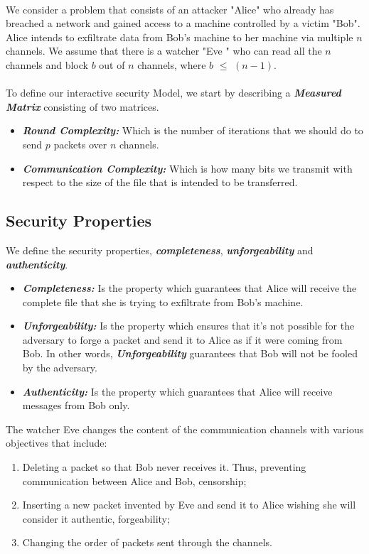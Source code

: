 \documentclass[main.tex]{subfiles}
\begin{document}
\paragraph{}
We consider a problem that consists of an attacker "Alice" who already has breached a network and gained access to a machine controlled by a victim "Bob". Alice intends to exfiltrate data from Bob's machine to her machine via multiple $n$ channels. We assume that there is a watcher "Eve " who can read all the $n$ channels and block $b$ out of $n$ channels, where $b$ $\leq$ $(n-1)$.\paragraph{} To define our interactive security Model, we start by describing a \textbf{\textit{ Measured Matrix}} consisting of two matrices. 
\begin{itemize}
  \item \textbf{\textit{ Round Complexity:}} Which is the number of iterations that we should do to send $p$ packets over $n$ channels.  \item \textbf{\textit {Communication Complexity:}} Which is how many bits we transmit with respect to the size of the file that is intended to be transferred. 
\end{itemize}
\subsection{Security Properties}
We define the security properties, \textbf{\textit{completeness}},  \textbf{\textit{unforgeability}} and \textbf{\textit{authenticity}}.
\begin{itemize}

  \item \textbf{\textit{Completeness:}} Is the property which guarantees that Alice will receive the complete file that she is trying to exfiltrate from Bob's machine.
  \item \textbf{\textit{Unforgeability:}} Is the property which ensures that it's not possible for the adversary to forge a packet and send it to Alice as if it were coming from Bob. In other words, \textbf{\textit{Unforgeability}} guarantees that Bob will not be fooled by the adversary.
  \item \textbf{\textit{Authenticity:}} Is the property which guarantees that Alice will receive messages from Bob only.
  
  
\end{itemize}
The watcher Eve  changes the content of the communication channels with various objectives that include:
\begin{enumerate}
\item Deleting a packet so that Bob never receives it. Thus, preventing communication between Alice and Bob, censorship;
\item Inserting a new packet invented by Eve  and send it to Alice wishing she will consider it authentic, forgeability;
\item Changing the order of packets sent through the channels.
\end{enumerate}
\end{document}
